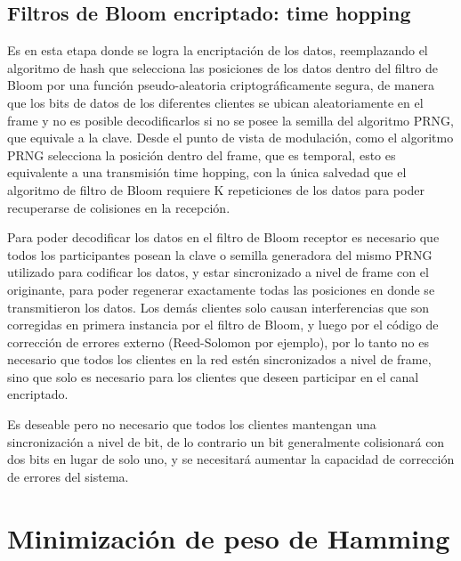 \subsection{Filtros de Bloom encriptado: time hopping}

Es en esta etapa donde se logra la encriptación de los datos, reemplazando el algoritmo de hash que selecciona las posiciones de los datos dentro del filtro de Bloom por una función pseudo-aleatoria criptográficamente segura, de manera que los bits de datos de los diferentes clientes se ubican aleatoriamente en el frame y no es posible decodificarlos si no se posee la semilla del algoritmo PRNG, que equivale a la clave. Desde el punto de vista de modulación, como el algoritmo PRNG selecciona la posición dentro del frame, que es temporal, esto es equivalente a una transmisión time hopping, con la única salvedad que el algoritmo de filtro de Bloom requiere K repeticiones de los datos para poder recuperarse de colisiones en la recepción.

Para poder decodificar los datos en el filtro de Bloom receptor es necesario que todos los participantes posean la clave o semilla generadora del mismo PRNG utilizado para codificar los datos, y estar sincronizado a nivel de frame con el originante, para poder regenerar exactamente todas las posiciones en donde se transmitieron los datos. Los demás clientes solo causan interferencias que son corregidas en primera instancia por el filtro de Bloom, y luego por el código de corrección de errores externo (Reed-Solomon por ejemplo), por lo tanto no es necesario que todos los clientes en la red estén sincronizados a nivel de frame, sino que solo es necesario para los clientes que deseen participar en el canal encriptado.

Es deseable pero no necesario que todos los clientes mantengan una sincronización a nivel de bit, de lo contrario un bit generalmente colisionará con dos bits en lugar de solo uno, y se necesitará aumentar la capacidad de corrección de errores del sistema.

\section{Minimización de peso de Hamming}

